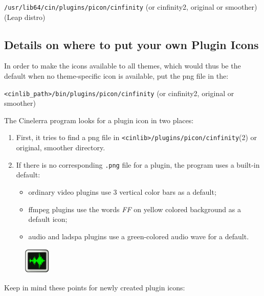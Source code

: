 \texttt{/usr/lib64/cin/plugins/picon/cinfinity} (or cinfinity2, original or smoother) (Leap distro)

\subsection{Details on where to put your own Plugin Icons}%
\label{sub:details_put_plugin_icons}

In order to make the icons available to all themes, which would thus be the default when no theme-specific icon is available, put the png file in the:

\texttt{<cinlib\_path>/bin/plugins/picon/cinfinity} (or cinfinity2, original or smoother)

The Cinelerra program looks for a plugin icon in two places:

\begin{enumerate}
    \item First, it tries to find a png file in \texttt{<cinlib>/plugins/picon/cinfinity}(2) or original, smoother directory.
    \item If there is no corresponding \texttt{.png} file for a plugin, the program uses a built-in default:
    \begin{itemize}
        \item ordinary video plugins use 3 vertical color bars as a default;
        \item ffmpeg plugins use the words \textit{FF} on yellow colored background as a default icon;        
        \item audio and ladspa plugins use a green-colored audio wave for a default.              
    \end{itemize}
\end{enumerate}
\begin{figure}[htpb]          
    \centering
    \includegraphics[width=0.05\linewidth]{images/audio-default.png} 
\end{figure} 

Keep in mind these points for newly created plugin icons:


